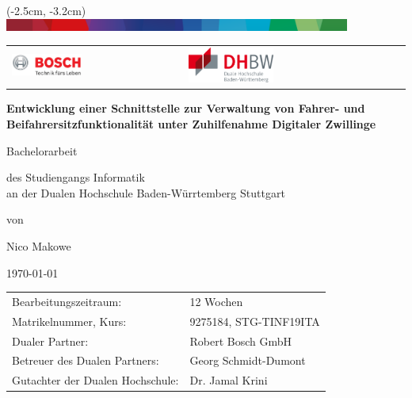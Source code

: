 \begin{titlepage}
	\begin{center}
		\begin{textblock*}{210mm}(-2.5cm, -3.2cm)
			\includegraphics[width=\paperwidth, height=4mm]{images/shared/Bosch-Supergraphic-Crop}
		\end{textblock*}
	\end{center}

	\vspace{-2.0cm}
	\begin{table}[h]
		\centering
		\begin{tabular}{p{}p{}p{}}
				\includegraphics[width=0.45\textwidth]{images/shared/Bosch-Logo-Ohne-Supergraphic} & &
				\raggedright
				\includegraphics[width=0.4\textwidth]{images/shared/DHBW-Logo}
		\end{tabular}
	\end{table}
		
	\begin{center}
		\LARGE
		\vspace*{1.5cm}
		
		\textbf{Entwicklung einer Schnittstelle zur Verwaltung von Fahrer- und Beifahrersitzfunktionalität unter Zuhilfenahme Digitaler Zwillinge}
		
		\vspace{1cm}
		\Large
		Bachelorarbeit
	
		\large
		\vspace{1cm}
		des Studiengangs Informatik \\ an der Dualen Hochschule Baden-Würrtemberg Stuttgart
		
		\vspace{1cm}
		von
		
		\Large
		\vspace{1cm}
		Nico Makowe
		
		\vspace{1cm}
		\today
		
		\vfill
		\large
		\begin{tabular}{l l}
			Bearbeitungszeitraum: & 12 Wochen \\
			Matrikelnummer, Kurs: & 9275184, STG-TINF19ITA \\
			Dualer Partner: & Robert Bosch GmbH \\
			Betreuer des Dualen Partners: & Georg Schmidt-Dumont\\
			Gutachter der Dualen Hochschule: & Dr. Jamal Krini
		\end{tabular}
	\end{center}
\end{titlepage}